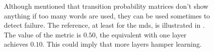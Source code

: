 \begin{figure}[H]
{	}
	\caption{Although mentioned that transition probability matrices don't show anything if too many words are used, they can be used sometimes to detect failure. The reference, at least for the \gls{mds}, is illustrated in \figref{\ref{fig: w2w model gt en}}. The value of the metric is $ 0.50 $, the equivalent with one layer achieves $ 0.10 $. This could imply that more layers hamper learning.}
	\label{fig: text model en ohe 40L}
\end{figure}
%
\clearpage
\begin{figure}[H]
	\centering
	\hfill
\end{figure}
